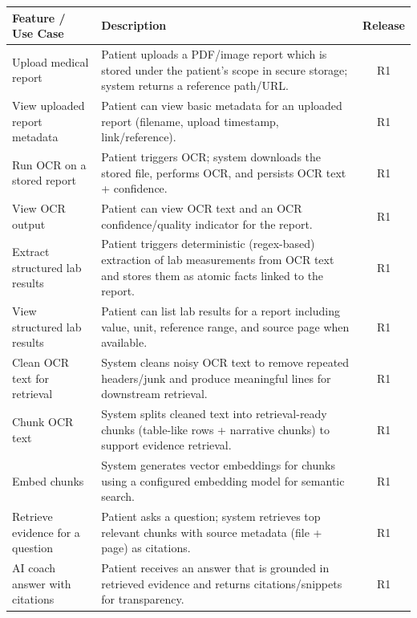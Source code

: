 \documentclass[12pt, a4paper]{article}
\begin{document}
\begin{table}[htbp]
    \centering
    \small
    \renewcommand{\arraystretch}{1.2}
    \begin{tabularx}{\textwidth}{|>{\raggedright\arraybackslash}p{4cm}|X|c|}
        \hline
        \textbf{Feature / Use Case} & \textbf{Description} & \textbf{Release} \\
        \hline
        Upload medical report & Patient uploads a PDF/image report which is stored under the patient’s scope in secure storage; system returns a reference path/URL. & R1 \\
        \hline
        View uploaded report metadata & Patient can view basic metadata for an uploaded report (filename, upload timestamp, link/reference). & R1 \\
        \hline
        Run OCR on a stored report & Patient triggers OCR; system downloads the stored file, performs OCR, and persists OCR text + confidence. & R1 \\
        \hline
        View OCR output & Patient can view OCR text and an OCR confidence/quality indicator for the report. & R1 \\
        \hline
        Extract structured lab results & Patient triggers deterministic (regex-based) extraction of lab measurements from OCR text and stores them as atomic facts linked to the report. & R1 \\
        \hline
        View structured lab results & Patient can list lab results for a report including value, unit, reference range, and source page when available. & R1 \\
        \hline
        Clean OCR text for retrieval & System cleans noisy OCR text to remove repeated headers/junk and produce meaningful lines for downstream retrieval. & R1 \\
        \hline
        Chunk OCR text & System splits cleaned text into retrieval-ready chunks (table-like rows + narrative chunks) to support evidence retrieval. & R1 \\
        \hline
        Embed chunks & System generates vector embeddings for chunks using a configured embedding model for semantic search. & R1 \\
        \hline
        Retrieve evidence for a question & Patient asks a question; system retrieves top relevant chunks with source metadata (file + page) as citations. & R1 \\
        \hline
        AI coach answer with citations & Patient receives an answer that is grounded in retrieved evidence and returns citations/snippets for transparency. & R1 \\

\end{tabularx}
\end{table}
\end{document}
